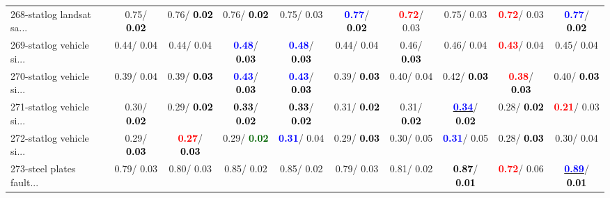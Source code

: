 \begin{table}[h]
\begin{center}
{\begin{tabular}{lc|c|c|c|c|c|c|c|c}
268-statlog landsat sa... &   0.75/\textcolor{black}{\textbf{  0.02}} &   0.76/\textcolor{black}{\textbf{  0.02}} &   0.76/\textcolor{black}{\textbf{  0.02}} &   0.75/  0.03 & \textcolor{blue}{\textbf{  0.77}}/\textcolor{black}{\textbf{  0.02}} & \textcolor{red}{\textbf{  0.72}}/  0.03 &   0.75/  0.03 & \textcolor{red}{\textbf{  0.72}}/  0.03 & \textcolor{blue}{\textbf{  0.77}}/\textcolor{black}{\textbf{  0.02}} \\
269-statlog vehicle si... &   0.44/  0.04 &   0.44/  0.04 & \textcolor{blue}{\textbf{  0.48}}/\textcolor{black}{\textbf{  0.03}} & \textcolor{blue}{\textbf{  0.48}}/\textcolor{black}{\textbf{  0.03}} &   0.44/  0.04 &   0.46/\textcolor{black}{\textbf{  0.03}} &   0.46/  0.04 & \textcolor{red}{\textbf{  0.43}}/  0.04 &   0.45/  0.04 \\
270-statlog vehicle si... &   0.39/  0.04 &   0.39/\textcolor{black}{\textbf{  0.03}} & \textcolor{blue}{\textbf{  0.43}}/\textcolor{black}{\textbf{  0.03}} & \textcolor{blue}{\textbf{  0.43}}/\textcolor{black}{\textbf{  0.03}} &   0.39/\textcolor{black}{\textbf{  0.03}} &   0.40/  0.04 &   0.42/\textcolor{black}{\textbf{  0.03}} & \textcolor{red}{\textbf{  0.38}}/\textcolor{black}{\textbf{  0.03}} &   0.40/\textcolor{black}{\textbf{  0.03}} \\ \hline
271-statlog vehicle si... &   0.30/\textcolor{black}{\textbf{  0.02}} &   0.29/\textcolor{black}{\textbf{  0.02}} & \textcolor{black}{\textbf{  0.33}}/\textcolor{black}{\textbf{  0.02}} & \textcolor{black}{\textbf{  0.33}}/\textcolor{black}{\textbf{  0.02}} &   0.31/\textcolor{black}{\textbf{  0.02}} &   0.31/\textcolor{black}{\textbf{  0.02}} & \underline{\textcolor{blue}{\textbf{  0.34}}}/\textcolor{black}{\textbf{  0.02}} &   0.28/\textcolor{black}{\textbf{  0.02}} & \textcolor{red}{\textbf{  0.21}}/  0.03 \\
272-statlog vehicle si... &   0.29/\textcolor{black}{\textbf{  0.03}} & \textcolor{red}{\textbf{  0.27}}/\textcolor{black}{\textbf{  0.03}} &   0.29/\textcolor{darkgreen}{\textbf{  0.02}} & \textcolor{blue}{\textbf{  0.31}}/  0.04 &   0.29/\textcolor{black}{\textbf{  0.03}} &   0.30/  0.05 & \textcolor{blue}{\textbf{  0.31}}/  0.05 &   0.28/\textcolor{black}{\textbf{  0.03}} &   0.30/  0.04 \\
273-steel plates fault... &   0.79/  0.03 &   0.80/  0.03 &   0.85/  0.02 &   0.85/  0.02 &   0.79/  0.03 &   0.81/  0.02 & \textcolor{black}{\textbf{  0.87}}/\textcolor{black}{\textbf{  0.01}} & \textcolor{red}{\textbf{  0.72}}/  0.06 & \underline{\textcolor{blue}{\textbf{  0.89}}}/\textcolor{black}{\textbf{  0.01}} \\

\end{tabular}}
\end{center}
\end{table}
